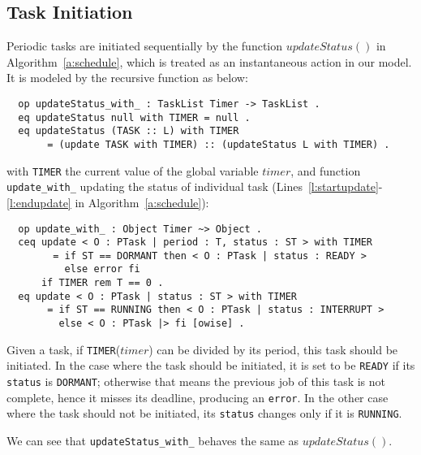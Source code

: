 \documentclass{llncs}
\begin{document}
\subsection{Task Initiation}
\label{ss:init}
Periodic tasks are initiated sequentially by the function
$updateStatus()$ in Algorithm~\ref{a:schedule}, which is treated as an
instantaneous action in our model. It is modeled by the recursive
function as below:
\begin{verbatim}
  op updateStatus_with_ : TaskList Timer -> TaskList . 
  eq updateStatus null with TIMER = null .
  eq updateStatus (TASK :: L) with TIMER
       = (update TASK with TIMER) :: (updateStatus L with TIMER) .
\end{verbatim}
with \verb|TIMER| the current value of the global variable $timer$,
and function \verb|update_with_| updating the status of individual
task (Lines~\ref{l:startupdate}-\ref{l:endupdate} in
Algorithm~\ref{a:schedule}):
\begin{verbatim}
  op update_with_ : Object Timer ~> Object .
  ceq update < O : PTask | period : T, status : ST > with TIMER
        = if ST == DORMANT then < O : PTask | status : READY >
          else error fi
      if TIMER rem T == 0 .
  eq update < O : PTask | status : ST > with TIMER
       = if ST == RUNNING then < O : PTask | status : INTERRUPT >
         else < O : PTask |> fi [owise] .
\end{verbatim}
Given a task, if \verb|TIMER|($timer$) can be divided by its period,
this task should be initiated.  In the case where the task should be
initiated, it is set to be \verb|READY| if its \verb|status| is
\verb|DORMANT|; otherwise that means the previous job of this task is
not complete, hence it misses its deadline, producing an
\verb|error|. In the other case where the task should not be
initiated, its \verb|status| changes only if it is \verb|RUNNING|. 

We can see that \verb|updateStatus_with_| behaves the same as
$updateStatus()$.
\end{document}
